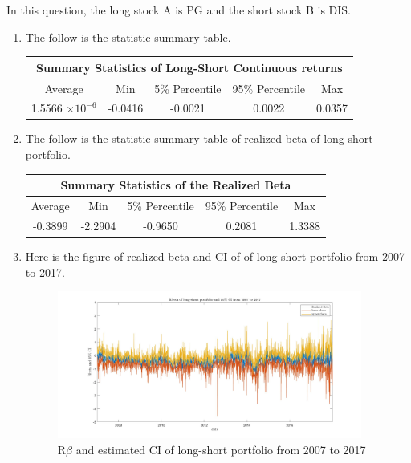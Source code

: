 \documentclass[12pt,letterpaper]{article}
\begin{document}
In this question, the long stock A is PG and the short stock B is DIS.
\begin{enumerate}[label=\textbf{(\Alph*)}]

\item 
The follow is the statistic summary table.
\begin{table}[ht]
\centering %
\begin{tabular}{ccccc} %
\hline\hline %
\multicolumn{5}{c}{Summary Statistics of Long-Short Continuous returns}\\ [0.5ex]%
\hline Average & Min & 5\% Percentile & 95\% Percentile & Max\\
\hline
1.5566 $\times10^{-6}$ & -0.0416 & -0.0021 & 0.0022 & 0.0357 \\
\hline %
\end{tabular}
\end{table}

\item 
The follow is the statistic summary table of realized beta of long-short portfolio.
\begin{table}[ht]
\centering %
\begin{tabular}{ccccc} %
\hline\hline %
\multicolumn{5}{c}{Summary Statistics of the Realized Beta}\\ [0.5ex]%
\hline Average & Min & 5\% Percentile & 95\% Percentile & Max\\
\hline
-0.3899 & -2.2904 & -0.9650 & 0.2081 & 1.3388\\
\hline %
\end{tabular}
\end{table}

\item Here is the figure of realized beta and CI of of long-short portfolio from 2007 to 2017.

\begin{figure}[H]
           \centering
            \includegraphics[width=10cm]{figures/q2_c.jpg}
            \centering
            \caption{R$\beta$ and estimated CI of long-short portfolio from 2007 to 2017}
\end{figure}


\end{enumerate}
\end{document}

